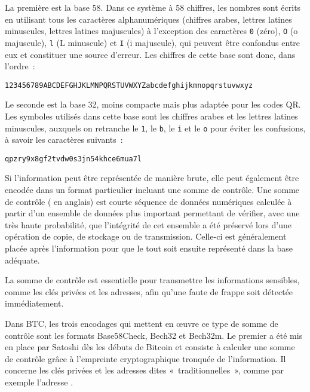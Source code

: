 La première est la base 58. Dans ce système à 58 chiffres, les nombres sont écrits en utilisant tous les caractères alphanumériques (chiffres arabes, lettres latines minuscules, lettres latines majuscules) à l'exception des caractères \verb?0? (zéro), \verb?O? (o majuscule), \verb?l? (L minuscule) et \verb?I? (i majuscule), qui peuvent être confondus entre eux et constituer une source d'erreur. Les chiffres de cette base sont donc, dans l'ordre~:

\begin{verbatim}
123456789ABCDEFGHJKLMNPQRSTUVWXYZabcdefghijkmnopqrstuvwxyz
\end{verbatim}


Le seconde est la base 32, moins compacte mais plus adaptée pour les codes QR. Les symboles utilisés dans cette base sont les chiffres arabes et les lettres latines minuscules, auxquels on retranche le \verb?1?, le \verb?b?, le \verb?i? et le \verb?o? pour éviter les confusions, à savoir les caractères suivants~: 

\begin{verbatim}
qpzry9x8gf2tvdw0s3jn54khce6mua7l
\end{verbatim}


Si l'information peut être représentée de manière brute, elle peut également être encodée dans un format particulier incluant une somme de contrôle. Une somme de contrôle ( en anglais) est courte séquence de données numériques calculée à partir d'un ensemble de données plus important permettant de vérifier, avec une très haute probabilité, que l'intégrité de cet ensemble a été préservé lors d'une opération de copie, de stockage ou de transmission. Celle-ci est généralement placée après l'information pour que le tout soit ensuite représenté dans la base adéquate.

La somme de contrôle est essentielle pour transmettre les informations sensibles, comme les clés privées et les adresses, afin qu'une faute de frappe soit détectée immédiatement.

Dans BTC, les trois encodages qui mettent en œuvre ce type de somme de contrôle sont les formats Base58Check, Bech32 et Bech32m. Le premier a été mis en place par Satoshi dès les débuts de Bitcoin et consiste à calculer une somme de contrôle grâce à l'empreinte cryptographique tronquée de l'information. Il concerne les clés privées et les adresses dites «~traditionnelles~», comme par exemple l'adresse .

